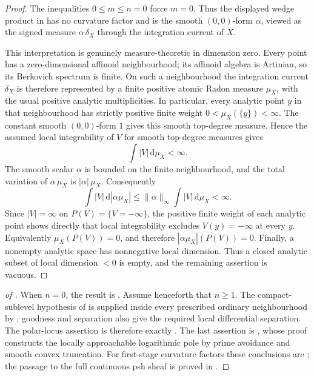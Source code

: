 \begin{proof}
The inequalities $0\leq m\leq n=0$ force $m=0$.  Thus the displayed wedge
product in  has no curvature factor
and is the smooth $(0,0)$-form $\alpha$, viewed as the signed measure
$\alpha\,\delta_X$ through the integration current of $X$.

This interpretation is genuinely measure-theoretic in dimension zero.
Every point has a zero-dimensional affinoid neighbourhood; its affinoid
algebra is Artinian, so its Berkovich spectrum is finite.  On such a
neighbourhood the integration current $\delta_X$ is therefore represented
by a finite positive atomic Radon measure $\mu_X$, with the usual positive
analytic multiplicities.  In particular, every analytic point $y$ in that
neighbourhood has strictly positive finite weight
$0<\mu_X(\{y\})<\infty$.  The constant smooth $(0,0)$-form $1$ gives this
smooth top-degree measure.  Hence the assumed local integrability of $V$
for smooth top-degree measures gives
\[
                       \int |V|\,\mathrm d\mu_X<\infty.
\]
The smooth scalar $\alpha$ is bounded on the finite neighbourhood, and
the total variation of $\alpha\,\mu_X$ is $|\alpha|\,\mu_X$.  Consequently
\[
 \int |V|\,\mathrm d|\alpha\mu_X|
 \leq \|\alpha\|_{\infty}\int |V|\,\mathrm d\mu_X<\infty.
\]
Since $|V|=\infty$ on $P(V)=\{V=-\infty\}$, the positive finite weight of
each analytic point shows directly that local integrability excludes
$V(y)=-\infty$ at every $y$.  Equivalently $\mu_X(P(V))=0$, and therefore
$|\alpha\mu_X|(P(V))=0$.  Finally, a nonempty analytic space has
nonnegative local dimension.  Thus a closed analytic subset of local
dimension $<0$ is empty, and the remaining assertion is vacuous.
\end{proof}

\begin{proof}[of ]
When $n=0$, the result is
.  Assume henceforth
that $n\geq1$.  The compact-sublevel hypothesis of
 is supplied inside every prescribed
ordinary neighbourhood by ; goodness and separation
also give the required local differential separation.  The polar-locus
assertion is therefore exactly .  The last
assertion is , whose proof constructs the
locally approachable logarithmic pole by prime avoidance and smooth convex
truncation.  For first-stage curvature factors these conclusions are
\cite[Theorem~16.9.2 and Corollaries~16.9.3--16.9.4]{CLD25}; the passage to
the full continuous psh sheaf is proved in
.
\end{proof}

